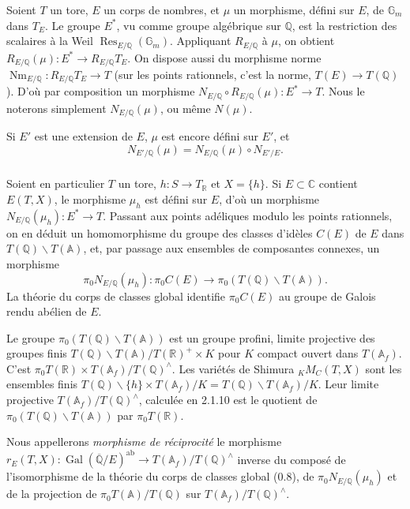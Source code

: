 \documentclass[12pt,a4paper]{article}
\theoremstyle{plain}
\theoremstyle{definition}
\theoremstyle{remark}
\DeclareMathOperator{\Gal}{Gal}
\DeclareMathOperator{\Res}{Res}
\DeclareMathOperator{\Nm}{Nm}
\newcommand{\QQ}{\mathbb{Q}}
\newcommand{\RR}{\mathbb{R}}
\newcommand{\CC}{\mathbb{C}}
\newcommand{\Af}{\mathbb{A}_f}
\newcommand{\A}{\mathbb{A}}
\newcommand{\Gm}{\mathbb{G}}
\begin{document}
\subsubsection{}

Soient $T$ un tore, $E$ un corps de nombres, et $\mu$ un morphisme, d\'efini sur $E$, de $\Gm_m$ dans $T_E$. Le groupe $E^*$, vu comme groupe alg\'ebrique sur $\QQ$, est la restriction des scalaires \`a la Weil $\Res_{E/\QQ}(\Gm_m)$. Appliquant $R_{E/\QQ}$ \`a $\mu$, on obtient $R_{E/\QQ}(\mu): E^* \to R_{E/\QQ}T_E$. On dispose aussi du morphisme norme $\Nm_{E/\QQ}: R_{E/\QQ}T_E \to T$ (sur les points rationnels, c'est la norme, $T(E) \to T(\QQ)$). D'o\`u par composition un morphisme $N_{E/\QQ} \circ R_{E/\QQ}(\mu): E^* \to T$. Nous le noterons simplement $N_{E/\QQ}(\mu)$, ou m\^eme $N(\mu)$.

Si $E'$ est une extension de $E$, $\mu$ est encore d\'efini sur $E'$, et
\begin{equation}\label{eq:2.2.2.1}
N_{E'/\QQ}(\mu) = N_{E/\QQ}(\mu) \circ N_{E'/E}.
\end{equation}

\subsubsection{}

Soient en particulier $T$ un tore, $h:S \to T_{\RR}$ et $X = \{h\}$. Si $E \subset \CC$ contient $E(T,X)$, le morphisme $\mu_h$ est d\'efini sur $E$, d'o\`u un morphisme $N_{E/\QQ}(\mu_h): E^* \to T$. Passant aux points ad\'eliques modulo les points rationnels, on en d\'eduit un homomorphisme du groupe des classes d'id\`eles $C(E)$ de $E$ dans $T(\QQ)\backslash T(\A)$, et, par passage aux ensembles de composantes connexes, un morphisme
\[
\pi_0 N_{E/\QQ}(\mu_h): \pi_0 C(E) \to \pi_0(T(\QQ)\backslash T(\A)).
\]
La th\'eorie du corps de classes global identifie $\pi_0 C(E)$ au groupe de Galois rendu ab\'elien de $E$.

Le groupe $\pi_0(T(\QQ)\backslash T(\A))$ est un groupe profini, limite projective des groupes finis $T(\QQ)\backslash T(\A)/T(\RR)^+ \times K$ pour $K$ compact ouvert dans $T(\Af)$. C'est $\pi_0 T(\RR) \times T(\Af)/T(\QQ)^{\wedge}$. Les vari\'et\'es de Shimura ${}_K M_C(T,X)$ sont les ensembles finis $T(\QQ)\backslash\{h\} \times T(\Af)/K = T(\QQ)\backslash T(\Af)/K$. Leur limite projective $T(\Af)/T(\QQ)^{\wedge}$, calcul\'ee en 2.1.10 est le quotient de $\pi_0(T(\QQ)\backslash T(\A))$ par $\pi_0 T(\RR)$.

Nous appellerons \textit{morphisme de r\'eciprocit\'e} le morphisme $r_E(T,X): \Gal(\overline{\QQ}/E)^{\text{ab}} \to T(\Af)/T(\QQ)^{\wedge}$ inverse du compos\'e de l'isomorphisme de la th\'eorie du corps de classes global (0.8), de $\pi_0 N_{E/\QQ}(\mu_h)$ et de la projection de $\pi_0 T(\A)/T(\QQ)$ sur $T(\Af)/T(\QQ)^{\wedge}$.
\end{document}
